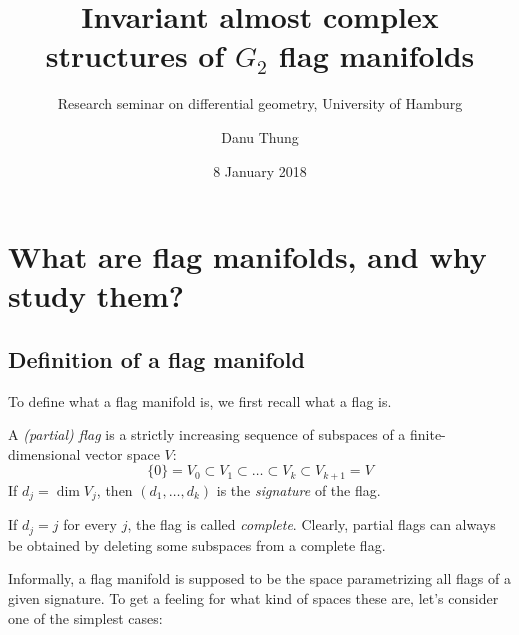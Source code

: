 \documentclass[parskip=half]{scrartcl}
\title{Invariant almost complex structures of $G_2$ flag manifolds\\[0.5cm]}
\subtitle{Research seminar on differential geometry, University of Hamburg}
\author{Danu Thung\\[1cm]}
\date{8 January 2018}
\begin{document}
\maketitle

\section{What are flag manifolds, and why study them?}

\subsection{Definition of a flag manifold}

To define what a flag manifold is, we first recall what a flag is.

\begin{onboard}
\begin{mydef}
	A \emph{(partial) flag} is a strictly increasing sequence of subspaces of a finite-dimensional vector space $V$:
	\begin{equation*}
		\{0\}=V_0\subset V_1 \subset \dots \subset V_k \subset V_{k+1}=V
	\end{equation*}
	If $d_j=\dim V_j$, then $(d_1,\dots,d_k)$ is the \emph{signature} of the flag.
\end{mydef}
\end{onboard}
If $d_j=j$ for every $j$, the flag is called \emph{complete}. Clearly, partial flags can always be obtained by deleting some subspaces from a complete flag.

Informally, a flag manifold is supposed to be the space parametrizing all flags of a given signature. To get a feeling for what kind of spaces these are, let's consider one of the simplest cases:
\end{document}
